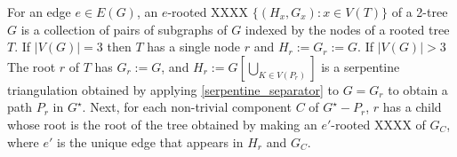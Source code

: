 \documentclass[kpfonts]{patmorin}
\DeclareMathOperator{\pw}{pw}
\DeclareMathOperator{\cbt}{cbt}
\DeclareMathOperator{\dc}{dc}
\begin{document}
%
%
%
%
%
%
%
%

For an edge $e\in E(G)$, an $e$-rooted XXXX $\{(H_x,G_x):x\in V(T)\}$ of a 2-tree $G$ is a collection of pairs of subgraphs of $G$ indexed by the nodes of a rooted tree $T$.  If $|V(G)|=3$ then $T$ has a single node $r$ and $H_r:=G_r:=G$.  If $|V(G)|>3$ The root $r$ of $T$ has $G_r:=G$, and $H_r:=G[\bigcup_{K\in V(P_r)}]$ is a serpentine triangulation obtained by applying \cref{serpentine_separator} to $G=G_r$ to obtain a path $P_r$ in $G^\star$.  Next, for each non-trivial component $C$ of $G^\star-P_r$, $r$ has a child whose root is the root of the tree obtained by making an $e'$-rooted XXXX of $G_C$, where $e'$ is the unique edge that appears in $H_r$ and $G_C$.
\end{document}
